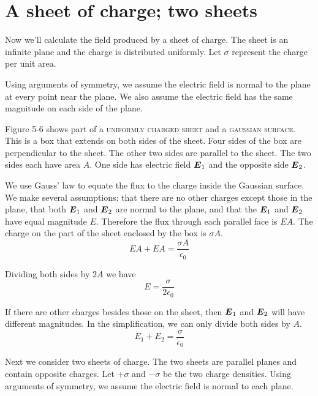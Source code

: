 \section{A sheet of charge; two sheets}

Now we'll calculate the field produced by a sheet of charge.
The sheet is an infinite plane and the charge is distributed uniformly.
Let $\sigma$ represent the charge per unit area.

Using arguments of symmetry,
we assume the electric field is normal to the plane at every point near the plane.
We also assume the electric field has the same magnitude on each side of the plane.

Figure 5-6 shows part of a \textsc{uniformly charged sheet} and a \textsc{gaussian surface}.
This is a box that extends on both sides of the sheet.
Four sides of the box are perpendicular to the sheet.
The other two sides are parallel to the sheet.
The two sides each have area $A$.
One side has electric field $\boldsymbol{E}_1$ and the opposite side $\boldsymbol{E}_2$.

We use Gauss' law to equate the flux to the charge inside the Gaussian surface.
We make several assumptions:
that there are no other charges except those in the plane,
that both $\boldsymbol{E}_1$ and $\boldsymbol{E}_2$ are normal to the plane,
and that the $\boldsymbol{E}_1$ and $\boldsymbol{E}_2$ have equal magnitude $E$.
Therefore the flux through each parallel face is $EA$.
The charge on the part of the sheet enclosed by the box is $\sigma A$.
\begin{equation*}
  EA + EA = \frac{\sigma A}{\epsilon_0}
\end{equation*}

Dividing both sides by $2A$ we have
\begin{equation}
  E = \frac{\sigma}{2 \epsilon_0}
\end{equation}

If there are other charges besides those on the sheet,
then $\boldsymbol{E}_1$ and $\boldsymbol{E}_2$ will have different magnitudes.
In the simplification, we can only divide both sides by $A$.
\begin{equation}
  E_1 + E_2 = \frac{\sigma}{\epsilon_0}
\end{equation}

Next we consider two sheets of charge.
The two sheets are parallel planes and contain opposite charges.
Let $+\sigma$ and $-\sigma$ be the two charge densities.
Using arguments of symmetry, we assume the electric field is normal to each plane.

